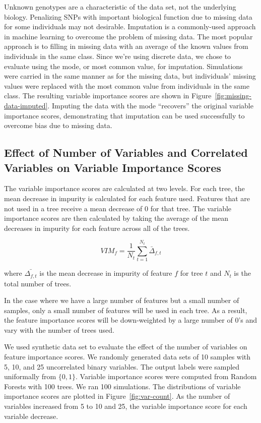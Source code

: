 Unknown genotypes are a characteristic of the data set, not the underlying biology.  Penalizing SNPs with important biological function due to missing data for some individuals may not desirable. Imputation is a commonly-used approach in machine learning to overcome the problem of missing data.  The most popular approach is to filling in missing data with an average of the known values from individuals in the same class.  Since we're using discrete data, we chose to evaluate using the mode, or most common value, for imputation.  Simulations were carried in the same manner as for the missing data, but individuals' missing values were replaced with the most common value from individuals in the same class.  The resulting variable importance scores are shown in Figure~\ref{fig:missing-data-imputed}.  Imputing the data with the mode ``recovers'' the original variable importance scores, demonstrating that imputation can be used successfully to overcome bias due to missing data.

\subsection{Effect of Number of Variables and Correlated Variables on Variable Importance Scores} \label{sec:correlated}
The variable importance scores are calculated at two levels.  For each tree, the mean decrease in impurity is calculated for each feature used.  Features that are not used in a tree receive a mean decrease of 0 for that tree.  The variable importance scores are then calculated by taking the average of the mean decreases in impurity for each feature across all of the trees.

\[
VIM_f = \frac {1} {N_t} \sum_{t=1}^{N_t} \bar{\Delta}_{f, t}
\]

where $\bar{\Delta_{f, t}}$ is the mean decrease in impurity of feature $f$ for tree $t$ and $N_t$ is the total number of trees.

In the case where we have a large number of features but a small number of samples, only a small number of features will be used in each tree.  As a result, the feature importance scores will be down-weighted by a large number of 0's and vary with the number of trees used.

We used synthetic data set to evaluate the effect of the number of variables on feature importance scores.  We randomly generated data sets of 10 samples with 5, 10, and 25 uncorrelated binary variables.  The output labels were sampled uniformally from $\{0, 1\}$.  Variable importance scores were computed from Random Forests with 100 trees.  We ran 100 simulations.  The distributions of variable importance scores are plotted in Figure~\ref{fig:var-count}.  As the number of variables increased from 5 to 10 and 25, the variable importance score for each variable decrease.

